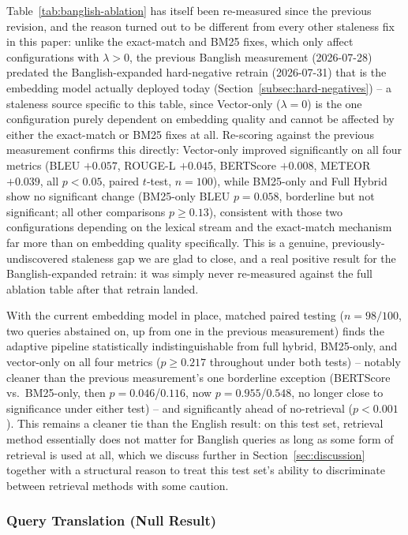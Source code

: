 \documentclass[a4paper,twoside]{article}
\begin{document}
Table~\ref{tab:banglish-ablation} has itself been re-measured since the previous revision, and the reason turned out to be different from every other staleness fix in this paper: unlike the exact-match and BM25 fixes, which only affect configurations with $\lambda>0$, the previous Banglish measurement (2026-07-28) predated the Banglish-expanded hard-negative retrain (2026-07-31) that is the embedding model actually deployed today (Section~\ref{subsec:hard-negatives}) -- a staleness source specific to this table, since Vector-only ($\lambda=0$) is the one configuration purely dependent on embedding quality and cannot be affected by either the exact-match or BM25 fixes at all. Re-scoring against the previous measurement confirms this directly: Vector-only improved significantly on all four metrics (BLEU $+0.057$, ROUGE-L $+0.045$, BERTScore $+0.008$, METEOR $+0.039$, all $p<0.05$, paired $t$-test, $n=100$), while BM25-only and Full Hybrid show no significant change (BM25-only BLEU $p=0.058$, borderline but not significant; all other comparisons $p\geq0.13$), consistent with those two configurations depending on the lexical stream and the exact-match mechanism far more than on embedding quality specifically. This is a genuine, previously-undiscovered staleness gap we are glad to close, and a real positive result for the Banglish-expanded retrain: it was simply never re-measured against the full ablation table after that retrain landed.

With the current embedding model in place, matched paired testing ($n=98/100$, two queries abstained on, up from one in the previous measurement) finds the adaptive pipeline statistically indistinguishable from full hybrid, BM25-only, and vector-only on all four metrics ($p\geq0.217$ throughout under both tests) -- notably cleaner than the previous measurement's one borderline exception (BERTScore vs.\ BM25-only, then $p=0.046$/$0.116$, now $p=0.955$/$0.548$, no longer close to significance under either test) -- and significantly ahead of no-retrieval ($p<0.001$). This remains a cleaner tie than the English result: on this test set, retrieval method essentially does not matter for Banglish queries as long as some form of retrieval is used at all, which we discuss further in Section~\ref{sec:discussion} together with a structural reason to treat this test set's ability to discriminate between retrieval methods with some caution.

\subsubsection{Query Translation (Null Result)}
\end{document}
